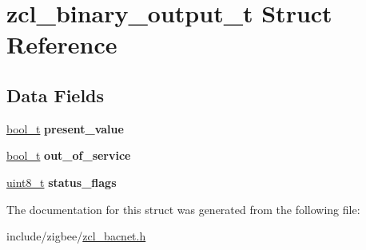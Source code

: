 \hypertarget{structzcl__binary__output__t}{}\section{zcl\+\_\+binary\+\_\+output\+\_\+t Struct Reference}
\label{structzcl__binary__output__t}
\subsection*{Data Fields}
\begin{DoxyCompactItemize}
\item 
\mbox{\label{structzcl__binary__output__t_af4e8127dc0a55a10699a9061d39c69de}} 
\hyperlink{group__hal__dos_ga04dd5074964518403bf944f2b240a5f8}{bool\+\_\+t} {\bfseries present\+\_\+value}
\item 
\mbox{\label{structzcl__binary__output__t_a799c8381b2a5db57c647919204ccbcac}} 
\hyperlink{group__hal__dos_ga04dd5074964518403bf944f2b240a5f8}{bool\+\_\+t} {\bfseries out\+\_\+of\+\_\+service}
\item 
\mbox{\label{structzcl__binary__output__t_a10648237c443d265057a85b7d770d4ce}} 
\hyperlink{group__hal__dos_gae1affc9ca37cfb624959c866a73f83c2}{uint8\+\_\+t} {\bfseries status\+\_\+flags}
\end{DoxyCompactItemize}


The documentation for this struct was generated from the following file\+:\begin{DoxyCompactItemize}
\item 
include/zigbee/\hyperlink{zcl__bacnet_8h}{zcl\+\_\+bacnet.\+h}\end{DoxyCompactItemize}
